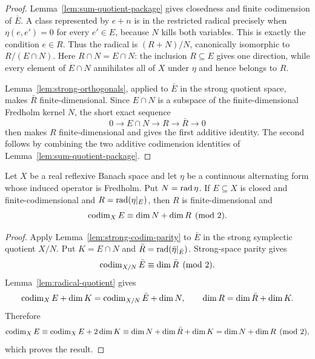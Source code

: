 \begin{proof}
Lemma~\ref{lem:sum-quotient-package} gives closedness and finite codimension of $\bar E$. A class
represented by $e+n$ is in the restricted radical precisely when
$\eta(e,e')=0$ for every $e'\in E$, because $N$ kills both variables. This is exactly the
condition $e\in R$. Thus the radical is $(R+N)/N$, canonically isomorphic to $R/(E\cap N)$.
Here $R\cap N=E\cap N$: the inclusion $R\subseteq E$ gives one direction, while every element of
$E\cap N$ annihilates all of $X$ under $\eta$ and hence belongs to $R$.

Lemma~\ref{lem:strong-orthogonals}, applied to $\bar E$ in the strong quotient space, makes
$\bar R$ finite-dimensional. Since $E\cap N$ is a subspace of the finite-dimensional Fredholm
kernel $N$, the short exact sequence
\[
  0\longrightarrow E\cap N\longrightarrow R\longrightarrow\bar R\longrightarrow0
\]
then makes $R$ finite-dimensional and gives the first additive identity. The second follows by
combining the two additive codimension identities of Lemma~\ref{lem:sum-quotient-package}.
\end{proof}

\begin{theorem}\label{thm:finite-codim-parity}
Let $X$ be a real reflexive Banach space and let $\eta$ be a continuous alternating form whose
induced operator is Fredholm. Put $N=\operatorname{rad}\eta$. If $E\subseteq X$ is closed and
finite-codimensional and $R=\operatorname{rad}(\eta|_E)$, then $R$ is finite-dimensional and
\[
  \operatorname{codim}_XE\equiv\dim N+\dim R\pmod2.
\]
\leanok
\end{theorem}

\begin{proof}
Apply Lemma~\ref{lem:strong-codim-parity} to $\bar E$ in the strong symplectic quotient $X/N$.
Put $K=E\cap N$ and $\bar R=\operatorname{rad}(\bar\eta|_{\bar E})$. Strong-space parity gives
\[
  \operatorname{codim}_{X/N}\bar E\equiv\dim\bar R\pmod2.
\]
Lemma~\ref{lem:radical-quotient} gives
\[
 \operatorname{codim}_XE+\dim K=\operatorname{codim}_{X/N}\bar E+\dim N,
 \qquad
 \dim R=\dim\bar R+\dim K.
\]
Therefore
\[
 \operatorname{codim}_XE\equiv\operatorname{codim}_XE+2\dim K
 \equiv\dim N+\dim\bar R+\dim K
 =\dim N+\dim R\pmod2,
\]
which proves the result.
\end{proof}
